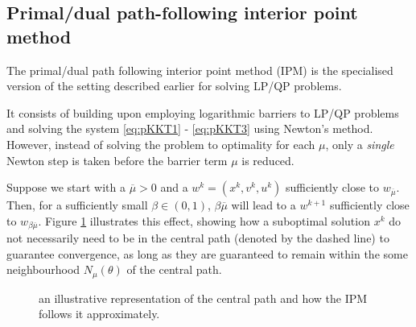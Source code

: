 \subsection{Primal/dual path-following interior point method}

The primal/dual path following interior point method (IPM) is the specialised version of the setting described earlier for solving LP/QP problems. 

It consists of building upon employing logarithmic barriers to LP/QP problems and solving the system \eqref{eq:pKKT1} - \eqref{eq:pKKT3} using Newton's method. However, instead of solving the problem to optimality for each $\mu$, only a \emph{single} Newton step is taken before the barrier term $\mu$ is reduced. 

Suppose we start with a $\overline{\mu} > 0$ and a $w^k = (x^k, v^k, u^k)$ sufficiently close to $w_{\overline{\mu}}$. Then, for a sufficiently small $\beta \in (0,1)$, $\beta\overline{\mu}$ will lead to a $w^{k+1}$ sufficiently close to $w_{\beta\overline{\mu}}$. Figure \ref{fig:approx_central} illustrates this effect, showing how a suboptimal solution $x^k$ do not necessarily need to be in the central path (denoted by the dashed line) to guarantee convergence, as long as they are guaranteed to remain within the some neighbourhood $N_\mu(\theta)$ of the central path.

\begin{figure}[h]
	\caption{an illustrative representation of the central path and how the IPM follows it approximately. }\label{fig:approx_central}
\end{figure}


